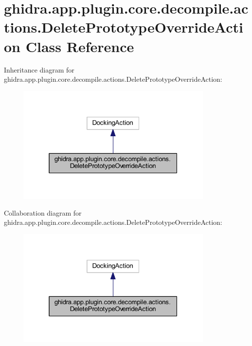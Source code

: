 \hypertarget{classghidra_1_1app_1_1plugin_1_1core_1_1decompile_1_1actions_1_1_delete_prototype_override_action}{}\section{ghidra.\+app.\+plugin.\+core.\+decompile.\+actions.\+Delete\+Prototype\+Override\+Action Class Reference}
\label{classghidra_1_1app_1_1plugin_1_1core_1_1decompile_1_1actions_1_1_delete_prototype_override_action}


Inheritance diagram for ghidra.\+app.\+plugin.\+core.\+decompile.\+actions.\+Delete\+Prototype\+Override\+Action\+:
\nopagebreak
\begin{figure}[H]
\begin{center}
\leavevmode
\includegraphics[width=277pt]{classghidra_1_1app_1_1plugin_1_1core_1_1decompile_1_1actions_1_1_delete_prototype_override_action__inherit__graph}
\end{center}
\end{figure}


Collaboration diagram for ghidra.\+app.\+plugin.\+core.\+decompile.\+actions.\+Delete\+Prototype\+Override\+Action\+:
\nopagebreak
\begin{figure}[H]
\begin{center}
\leavevmode
\includegraphics[width=277pt]{classghidra_1_1app_1_1plugin_1_1core_1_1decompile_1_1actions_1_1_delete_prototype_override_action__coll__graph}
\end{center}
\end{figure}

